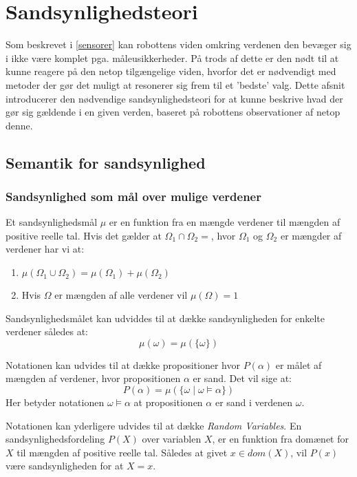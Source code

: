 \section{Sandsynlighedsteori}
Som beskrevet i \cref{sensorer} kan robottens viden omkring verdenen den bevæger sig i ikke være komplet pga. måleusikkerheder.
På trods af dette er den nødt til at kunne reagere på den netop tilgængelige viden, hvorfor det er nødvendigt med metoder der gør det muligt at resonerer sig frem til et 'bedste' valg.
Dette afsnit introducerer den nødvendige sandsynlighedsteori for at kunne beskrive hvad der gør sig gældende i en given verden, baseret på robottens observationer af netop denne.

\subsection{Semantik for sandsynlighed}

\subsubsection{Sandsynlighed som mål over mulige verdener}

Et sandsynlighedsmål $\mu$ er en funktion fra en mængde verdener til mængden af positive reelle tal. 
Hvis det gælder at $\Omega_1 \cap \Omega_2 = {}$, hvor $\Omega_1$ og $\Omega_2$ er mængder af verdener har vi at:
\begin{enumerate}
\item $\mu(\Omega_1 \cup \Omega_2) = \mu(\Omega_1) + \mu(\Omega_2)$
\item Hvis $\Omega$ er mængden af alle verdener vil $\mu(\Omega) = 1$ 
\end{enumerate}

Sandsynlighedsmålet kan udviddes til at dække sandsynligheden for enkelte verdener således at:
$$\mu(\omega) = \mu(\{\omega\})$$

Notationen kan udvides til at dække propositioner hvor $P(\alpha)$ er målet af mængden af verdener, hvor propositionen $\alpha$ er sand.
Det vil sige at:
$$P(\alpha) = \mu(\{\omega \mid \omega \models \alpha \})$$
Her betyder notationen $\omega \models \alpha$ at propositionen $\alpha$ er sand i verdenen $\omega$.

Notationen kan yderligere udvides til at dække \emph{Random Variables}.
En sandsynlighedsfordeling $P(X)$ over variablen $ X $, er en funktion fra
domænet for $ X $ til mængden af positive reelle tal.
Således at givet $x \in dom(X)$, vil $P(x)$ være sandsynligheden for at $X = x$.

